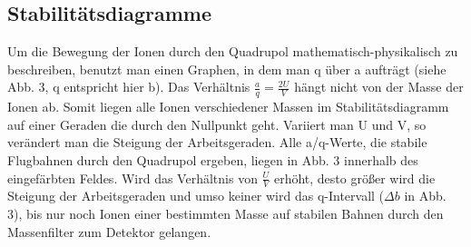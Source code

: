 \subsection{Stabilitätsdiagramme}
Um die Bewegung der Ionen durch den Quadrupol mathematisch-physikalisch zu beschreiben, benutzt man einen Graphen, in dem man q über a aufträgt (siehe Abb. 3, q entspricht hier b). Das Verhältnis $\frac{a}{q}=\frac{2U}{V}$ hängt nicht von der Masse der Ionen ab. Somit liegen alle Ionen verschiedener Massen im Stabilitätsdiagramm auf einer Geraden die durch den Nullpunkt geht. Variiert man U und V, so verändert man die Steigung der Arbeitsgeraden. Alle a/q-Werte, die stabile Flugbahnen durch den Quadrupol ergeben, liegen in Abb. 3 innerhalb des eingefärbten Feldes. Wird das Verhältnis von $\frac{U}{V}$ erhöht, desto größer wird die Steigung der Arbeitsgeraden und umso keiner wird das q-Intervall ($\Delta b$ in Abb. 3), bis nur noch Ionen einer bestimmten Masse auf stabilen Bahnen durch den Massenfilter zum Detektor gelangen.

\vspace{1cm}

